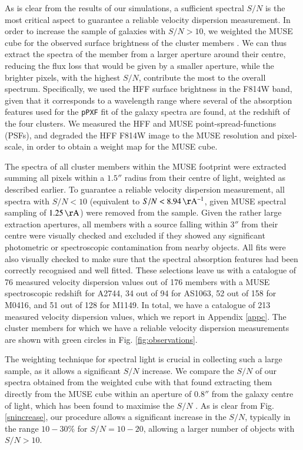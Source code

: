 \documentclass{aa}
\begin{document}
As is clear from the results of our simulations, a sufficient spectral $S/N$ is the most critical aspect to guarantee a reliable velocity dispersion measurement. In order to increase the sample of galaxies with $S/N>10$, we weighted the MUSE cube for the observed surface brightness of the cluster members \citep[as first done by][]{horne86}. We can thus extract the spectra of the member from a larger aperture around their centre, reducing the flux loss that would be given by a smaller aperture, while the brighter pixels, with the highest $S/N$, contribute the most to the overall spectrum. Specifically, we used the HFF surface brightness in the F814W band, given that it corresponds to a wavelength range where several of the absorption features used for the \texttt{pPXF} fit of the galaxy spectra are found, at the redshift of the four clusters. We measured the HFF and MUSE point-spread-functions (PSFs), and degraded the HFF F814W image to the MUSE resolution and pixel-scale, in order to obtain a weight map for the MUSE cube. 

The spectra of all cluster members within the MUSE footprint were extracted summing all pixels within a $1.5''$ radius from their centre of light, weighted as described earlier. To guarantee a reliable velocity dispersion measurement, all spectra with $S/N<10$ (equivalent to $S/N<8.94 \, \mathrm{\AA^{-1}}$, given MUSE spectral sampling of $1.25 \, \mathrm{\AA}$) were removed from the sample. Given the rather large extraction apertures, all members with a source falling within $3''$ from their centre were visually checked and excluded if they showed any significant photometric or spectroscopic contamination from nearby objects. All fits were also visually checked to make sure that the spectral absorption features had been correctly recognised and well fitted. These selections leave us with a catalogue of 76 measured velocity dispersion values out of 176 members with a MUSE spectroscopic redshift for A2744, 34 out of 94 for AS1063, 52 out of 158 for M0416, and 51 out of 128 for M1149. In total, we have a catalogue of 213 measured velocity dispersion values, which we report in Appendix \ref{appc}. The cluster members for which we have a reliable velocity dispersion measurements are shown with green circles in Fig. \ref{fig:observations}.

The weighting technique for spectral light is crucial in collecting such a large sample, as it allows a significant $S/N$ increase. We compare the $S/N$ of our spectra obtained from the weighted cube with that found extracting them directly from the MUSE cube within an aperture of $0.8''$ from the galaxy centre of light, which has been found to maximise the $S/N$ \citep[see][]{bergamini19,bergamini23}. As is clear from Fig. \ref{snincrease}, our procedure allows a significant increase in the $S/N$, typically in the range $10-30\%$ for $S/N=10-20$, allowing a larger number of objects with $S/N>10$.  
\end{document}
